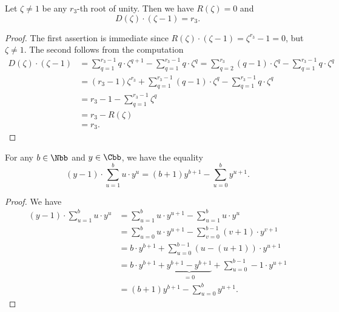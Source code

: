 \begin{lemma}\label{RD}
Let $\zeta\neq 1$ be any $r_3$-th root of unity. Then we have $R(\zeta)=0$ and $$D(\zeta)\cdot(\zeta-1)=r_3.$$
\end{lemma}
\begin{proof}
The first assertion is immediate since $R(\zeta)\cdot(\zeta-1)=\zeta^{r_3}-1=0$, but $\zeta\neq 1$. The second follows from the computation
\begin{equation*}
\begin{split}
D(\zeta)\cdot(\zeta-1)&=\sum_{q=1}^{r_3-1} q\cdot \zeta^{q+1}-\sum_{q=1}^{r_3-1} q\cdot \zeta^q=\sum_{q=2}^{r_3} (q-1)\cdot \zeta^{q}-\sum_{q=1}^{r_3-1} q\cdot \zeta^q\\
&=(r_3-1)\zeta^{r_3}+\sum_{q=1}^{r_3-1} (q-1)\cdot \zeta^{q}-\sum_{q=1}^{r_3-1} q\cdot \zeta^q\\
&=r_3-1-\sum_{q=1}^{r_3-1} \zeta^{q}\\
&=r_3- R(\zeta)\\
&=r_3.
\end{split}
\end{equation*}
\end{proof}

\begin{lemma}\label{argeo}
For any $b\in\Nbb$ and $y\in\Cbb$, we have the equality
$$(y-1)\cdot\sum_{u=1}^{b}u\cdot y^u=(b+1)y^{b+1}-\sum_{u=0}^b y^{u+1}.$$
\end{lemma}
\begin{proof}
We have 
\begin{align*}
(y-1)\cdot\sum_{u=1}^{b}u\cdot y^u&=\sum_{u=1}^{b}u\cdot y^{u+1}-\sum_{u=1}^{b}u\cdot y^u\\
&=\sum_{u=0}^{b}u\cdot y^{u+1}-\sum_{v=0}^{b-1}(v+1)\cdot y^{v+1}\\
&=b\cdot y^{b+1}+\sum_{u=0}^{b-1}(u-(u+1))\cdot y^{u+1}\\
&=b\cdot y^{b+1}+\underbrace{y^{b+1}-y^{b+1}}_{=0}+\sum_{u=0}^{b-1}-1\cdot y^{u+1}\\
&=(b+1)y^{b+1}-\sum_{u=0}^b y^{u+1}.
\end{align*}
\end{proof}

